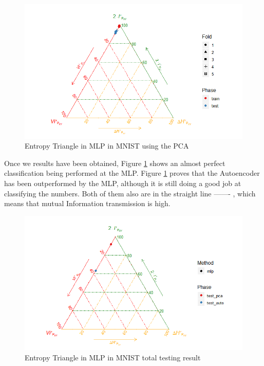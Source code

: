 \begin{figure}[H]
	\centering
	\includegraphics[width=1\linewidth]{Figuras_tfg/MNIST_PCA_mlp}
	\caption{Entropy Triangle in MLP in MNIST using the PCA}
	\label{fig:figure_MLP_MNIS_ET_PCA}
\end{figure}

Once we results have been obtained, Figure \ref{fig:figure_MLP_MNIS_ET_PCA} shows an almost perfect classification being performed at the MLP. Figure \ref{fig:figure_MLP_MNIS_ET_PCA} proves that the Autoencoder has been outperformed by the MLP, although it is still doing a good job at classifying the numbers. Both of them also are in the straight line ------- , which means that mutual Information transmission is high.

\begin{figure}[H]
	\centering
	\includegraphics[width=1\linewidth]{Figuras_tfg/MNIST_performance_test}
	\caption{Entropy Triangle in MLP in MNIST total testing result}
	\label{fig:figure_MLP_MNIS_ET_Total}
\end{figure}

